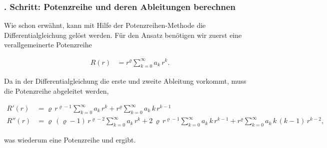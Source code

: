 \subsubsection{. Schritt: Potenzreihe und deren Ableitungen berechnen}
\begin{normalsize}
Wie schon erw\"ahnt,
kann mit Hilfe der Potenzreihen-Methode die Differentialgleichung  gel\"ost werden.
F\"ur den Ansatz ben\"otigen wir zuerst eine verallgemeinerte Potenzreihe
\end{normalsize}
\begin{align}
	R \left( r \right)
	&=
	r^{\varrho}
	\sum_{k=0}^{\infty} a_k \, r^k .
	\label{eq:bessel:potenzreihe:verallgemeinert}
\end{align}
\begin{normalsize}%
Da in der Differentialgleichung die erste und zweite Ableitung vorkommt,
muss die Potenzreihe abgeleitet werden,
\end{normalsize}
\begin{align}
	R'\left( r \right)
	&=
	\varrho \, r^{\varrho - 1}
	\sum_{k=0}^{\infty} a_k \, r^k
	+
	r^{\varrho}
	\sum_{k=0}^{\infty} a_k \, k \, r^{k - 1}
	\label{eq:bessel:potenzreihe:ersteableitung}
\\
	R'' \left( r \right)
	&=
	\varrho \, \left( \varrho - 1 \right) \, r^{\varrho - 2}
	\sum_{k=0}^{\infty} a_k \, r^k
	+
	2 \, \varrho \, r^{\varrho - 1}
	\sum_{k=0}^{\infty} a_k \, k \, r^{k - 1}
	+
	r^{\varrho}
	\sum_{k=0}^{\infty} a_k \, k \, \left( k - 1 \right) \, r^{k - 2}	
	\label{eq:bessel:potenzreihe:zweiteableitung}
	\text{,}
\end{align}
\begin{normalsize}%
was wiederum eine Potenzreihe  und  ergibt.
\end{normalsize}
